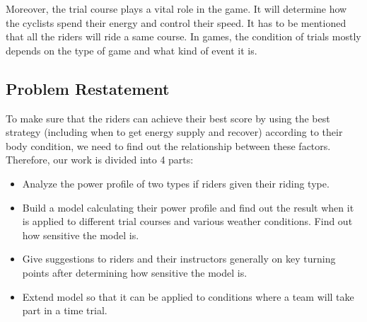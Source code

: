 \documentclass[14pt]{article}
\begin{document}
	Moreover, the trial course plays a vital role in the game. It will determine how the cyclists spend their energy and control their speed. It has to be mentioned that all the riders will ride a same course. In games, the condition of trials mostly depends on the type of game and what kind of event it is.
	\subsection{Problem Restatement}
	To make sure that the riders can achieve their best score by using the best strategy (including when to get energy supply and recover) according  to their body condition, we need to find out the relationship between these factors. Therefore, our work is divided into 4 parts:
	\begin{itemize}
		\item  Analyze the power profile of two types if riders given their riding type.
		\item  Build a model calculating their power profile and find out the result when it is applied to different trial courses and various weather conditions. Find out how sensitive the model is.
		\item  Give suggestions to riders and their instructors generally on key turning points after determining how sensitive the model is.
		\item  Extend model so that it can be applied to conditions where a team will take part in a time trial.
	\end{itemize}
\end{document}
